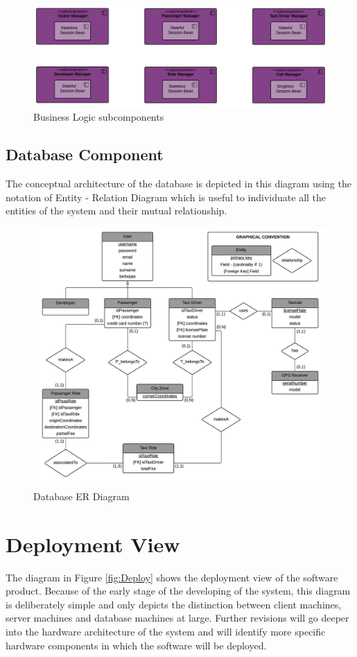 \begin{figure}[htbp]
\centering
\includegraphics[width=\textwidth]{cpt/img/ServerInterfaces}
\caption{Business Logic subcomponents}
\end{figure}
\clearpage

\subsection{Database Component}
The conceptual architecture of the database is depicted in this diagram using the notation of Entity - Relation Diagram which is useful to individuate all the entities of the system and their mutual relationship.

\begin{figure}[htbp]
\centering
\includegraphics[width=\textwidth]{cpt/img/Database}
\caption{Database ER Diagram}
\end{figure}
\clearpage

\section{Deployment View}
The diagram in Figure \ref{fig:Deploy} shows the deployment view of the software product. Because of the early stage of the developing of the system, this diagram is deliberately simple and only depicts the distinction between client machines, server machines and database machines at large. Further revisions will go deeper into the hardware architecture of the system and will identify more specific hardware components in which the software will be deployed.

